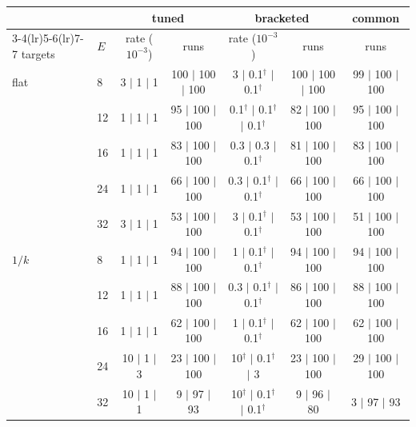 \begin{tabular}{llccccc}\toprule
 & & \multicolumn{2}{c}{tuned} & \multicolumn{2}{c}{bracketed} & common \\\cmidrule(lr){3-4}\cmidrule(lr){5-6}\cmidrule(lr){7-7}
targets & $E$ & rate ($10^{-3}$) & runs & rate ($10^{-3}$) & runs & runs \\\midrule
flat & 8 & 3 $|$ 1 $|$ 1 & 100 $|$ 100 $|$ 100 & 3 $|$ 0.1$^\dagger$ $|$ 0.1$^\dagger$ & 100 $|$ 100 $|$ 100 & 99 $|$ 100 $|$ 100 \\
 & 12 & 1 $|$ 1 $|$ 1 & 95 $|$ 100 $|$ 100 & 0.1$^\dagger$ $|$ 0.1$^\dagger$ $|$ 0.1$^\dagger$ & 82 $|$ 100 $|$ 100 & 95 $|$ 100 $|$ 100 \\
 & 16 & 1 $|$ 1 $|$ 1 & 83 $|$ 100 $|$ 100 & 0.3 $|$ 0.3 $|$ 0.1$^\dagger$ & 81 $|$ 100 $|$ 100 & 83 $|$ 100 $|$ 100 \\
 & 24 & 1 $|$ 1 $|$ 1 & 66 $|$ 100 $|$ 100 & 0.3 $|$ 0.1$^\dagger$ $|$ 0.1$^\dagger$ & 66 $|$ 100 $|$ 100 & 66 $|$ 100 $|$ 100 \\
 & 32 & 3 $|$ 1 $|$ 1 & 53 $|$ 100 $|$ 100 & 3 $|$ 0.1$^\dagger$ $|$ 0.1$^\dagger$ & 53 $|$ 100 $|$ 100 & 51 $|$ 100 $|$ 100 \\
\midrule
$1/k$ & 8 & 1 $|$ 1 $|$ 1 & 94 $|$ 100 $|$ 100 & 1 $|$ 0.1$^\dagger$ $|$ 0.1$^\dagger$ & 94 $|$ 100 $|$ 100 & 94 $|$ 100 $|$ 100 \\
 & 12 & 1 $|$ 1 $|$ 1 & 88 $|$ 100 $|$ 100 & 0.3 $|$ 0.1$^\dagger$ $|$ 0.1$^\dagger$ & 86 $|$ 100 $|$ 100 & 88 $|$ 100 $|$ 100 \\
 & 16 & 1 $|$ 1 $|$ 1 & 62 $|$ 100 $|$ 100 & 1 $|$ 0.1$^\dagger$ $|$ 0.1$^\dagger$ & 62 $|$ 100 $|$ 100 & 62 $|$ 100 $|$ 100 \\
 & 24 & 10 $|$ 1 $|$ 3 & 23 $|$ 100 $|$ 100 & 10$^\dagger$ $|$ 0.1$^\dagger$ $|$ 3 & 23 $|$ 100 $|$ 100 & 29 $|$ 100 $|$ 100 \\
 & 32 & 10 $|$ 1 $|$ 1 & 9 $|$ 97 $|$ 93 & 10$^\dagger$ $|$ 0.1$^\dagger$ $|$ 0.1$^\dagger$ & 9 $|$ 96 $|$ 80 & 3 $|$ 97 $|$ 93 \\
\bottomrule
\end{tabular}
